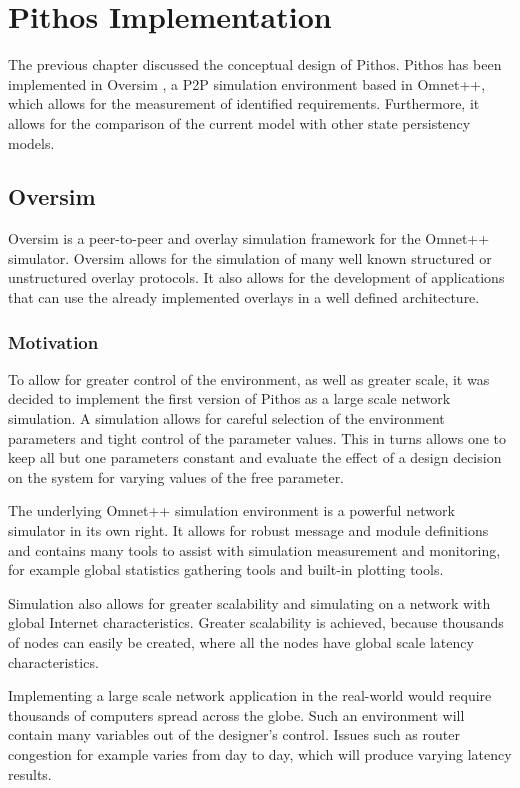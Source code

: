 \chapter{Pithos Implementation}
\label{chp:IMPLEMENTATION}

The previous chapter discussed the conceptual design of Pithos. Pithos has been implemented in Oversim \cite{OverSim_2007}, a P2P simulation environment based in Omnet++, which allows for the measurement of identified requirements. Furthermore, it allows for the comparison of the current model with other state persistency models.

\section{Oversim}

Oversim is a peer-to-peer and overlay simulation framework for the Omnet++ simulator. Oversim allows for the simulation of many well known structured or unstructured overlay protocols. It also allows for the development of applications that can use the already implemented overlays in a well defined architecture.

\subsection{Motivation}

To allow for greater control of the environment, as well as greater scale, it was decided to implement the first version of Pithos as a large scale network simulation. A simulation allows for careful selection of the environment parameters and tight control of the parameter values. This in turns allows one to keep all but one parameters constant and evaluate the effect of a design decision on the system for varying values of the free parameter.

The underlying Omnet++ simulation environment is a powerful network simulator in its own right. It allows for robust message and module definitions and contains many tools to assist with simulation measurement and monitoring, for example global statistics gathering tools and built-in plotting tools.

Simulation also allows for greater scalability and simulating on a network with global Internet characteristics. Greater scalability is achieved, because thousands of nodes can easily be created, where all the nodes have global scale latency characteristics.

Implementing a large scale network application in the real-world would require thousands of computers spread across the globe. Such an environment will contain many variables out of the designer's control. Issues such as router congestion for example varies from day to day, which will produce varying latency results.

